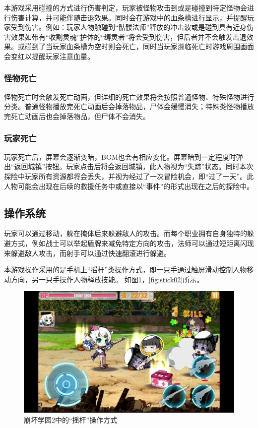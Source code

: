 \documentclass[UTF8,AutoFakeBold=1,AutoFakeSlant,zihao=-4]{cucthesis}
\begin{document}
本游戏采用碰撞的方式进行伤害判定，玩家被怪物攻击到或是碰撞到特定怪物会进行伤害计算，并可能伴随击退效果。同时会在游戏中的血条槽进行显示，并提醒玩家受到伤害。例如：玩家人物触碰到“骷髅法师”释放的冲击波或是碰到具有近身伤害效果如带有“收割灵魂”护体的“缚灵者”将会受到伤害，但后者并不会触发击退效果。或碰到了当玩家血条槽为空时则会死亡，同时当玩家濒临死亡时游戏周围画面会变红以提醒玩家注意血量。

\subsubsection{怪物死亡}
怪物死亡时会触发死亡动画，但详细的死亡效果将会按照普通怪物、特殊怪物进行分类。普通怪物播放完死亡动画后会掉落物品，尸体会缓慢消失；特殊类怪物播放完死亡动画后也会掉落物品，但尸体不会消失。

\subsubsection{玩家死亡}
玩家死亡后，屏幕会逐渐变暗，BGM也会有相应变化。屏幕暗到一定程度时弹出“返回城镇”按钮。玩家点击后将会返回城镇，此人物视为“失踪”状态。同时本次探险中玩家所有资源都将会丢失，并视为经过了一次冒险机会，即“过了一天”。此人物可能会出现在后续的救援任务中或直接以“事件”的形式出现在之后的探险中。


\subsection{操作系统}
玩家可以通过移动，躲在掩体后来躲避敌人的攻击。而每个职业拥有自身独特的躲避方式，例如战士可以举起盾牌来减免特定方向的攻击，法师可以通过短距离闪现来躲避敌人攻击，而射手可以通过快速翻滚进行躲避。

本游戏操作采用的是手机上“摇杆”类操作方式，即一只手通过触屏滑动控制人物移动方向，另一只手操作人物释放技能。
如图\ref{fig:stick01}，\ref{fig:stick02}所示。

\begin{figure}[ht]
    \centering
    \includegraphics[scale=0.64]{imgs/崩坏2摇杆.jpg}    
    \caption{崩坏学园2中的“摇杆”操作方式}
    \label{fig:stick01}
\end{figure}
\end{document}
